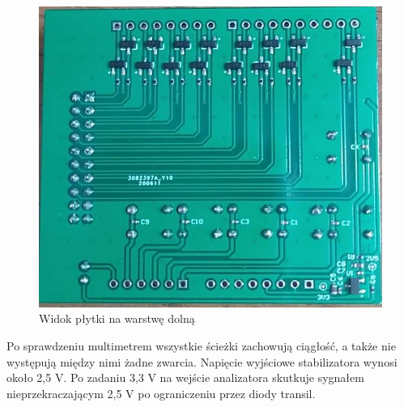 \begin{figure}[H]
\begin{center}
\includegraphics[width=4 in]{images/PCB_rear.jpeg}
\end{center}
\caption{Widok płytki na warstwę dolną}
\label{fig:PCB_bottom}
\end{figure}

Po sprawdzeniu multimetrem wszystkie ścieżki zachowują ciągłość, a także nie występują między nimi żadne zwarcia. Napięcie wyjściowe stabilizatora wynosi około 2,5 V. Po zadaniu 3,3 V na wejście analizatora skutkuje sygnałem nieprzekraczającym 2,5 V po ograniczeniu przez diody transil.